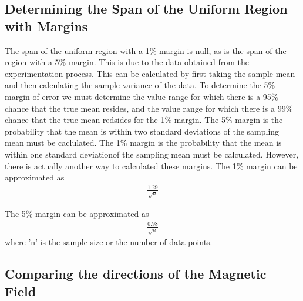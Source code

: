 \documentclass[a4paper]{article}
\begin{document}
\subsection{Determining the Span of the Uniform Region with Margins}
\qq The span of the uniform region with a 1$\%$ margin is null, as is
the span of the region with a 5$\%$ margin. This is due to the data
obtained from the experimentation process. This can be calculated by
first taking the sample mean and then calculating the sample variance
of the data. To determine the 5$\%$ margin of error we must determine
the value range for which there is a 95$\%$ chance that the true mean
resides, and the value range for which there is a 99$\%$ chance that
the true mean redsides for the 1$\%$ margin. The 5$\%$ margin is the
probability that the mean is within two standard deviations of the
sampling mean must be caclulated. The 1$\%$ margin is the probability
that the mean is within one standard deviationof the sampling mean
must be calculated. However, there is actually another way to
calculated these margins. The 1$\%$ margin can be approximated as
\begin{align}
\frac{1.29}{\sqrt{n}}
\end{align}

The 5$\%$ margin can be approximated as
\begin{align}
\frac{0.98}{\sqrt{n}}
\end{align}
where 'n' is the sample size or the number of data points.

\subsection{Comparing the directions of the Magnetic Field}
\end{document}
